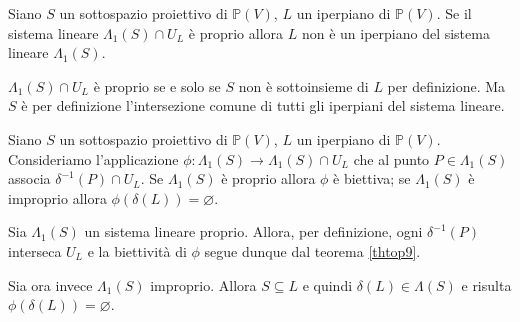 \begin{Theorem}\label{th37}
	Siano $S$ un sottospazio proiettivo di $\mathbb{P}(V)$, $L$ un iperpiano di $\mathbb{P}(V)$. Se il sistema lineare $\Lambda_1(S) \cap U_L$ \`e proprio allora $L$ non \`e un iperpiano del sistema lineare $\Lambda_1(S)$.
\end{Theorem}
\Proof $\Lambda_1(S) \cap U_L$ \`e proprio se e solo se $S$ non \`e sottoinsieme di $L$ per definizione. Ma $S$ \`e per definizione l'intersezione comune di tutti gli iperpiani del sistema lineare. \EndProof
\begin{Theorem}\label{th40}
	Siano $S$ un sottospazio proiettivo di $\mathbb{P}(V)$, $L$ un iperpiano di $\mathbb{P}(V)$. Consideriamo l'applicazione $\phi: \Lambda_1(S) \rightarrow \Lambda_1(S) \cap U_L$ che al punto $P \in \Lambda_1(S)$ associa $\delta^{-1}(P) \cap U_L$. Se $\Lambda_1(S)$ \`e proprio allora $\phi$ \`e biettiva; se $\Lambda_1(S)$ \`e improprio allora $\phi(\delta(L)) = \varnothing$.
\end{Theorem}
\Proof Sia $\Lambda_1(S)$ un sistema lineare proprio. Allora, per definizione, ogni $\delta^{-1}(P)$ interseca $U_L$ e la biettivit\`a di $\phi$ segue dunque dal teorema \ref{thtop9}.
	\par Sia ora invece $\Lambda_1(S)$ improprio. Allora $S \subseteq L$ e quindi $\delta(L) \in \Lambda(S)$ e risulta $\phi(\delta(L)) = \varnothing$. \EndProof
